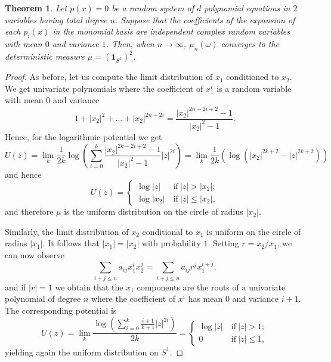 \documentclass[12pt]{article}
\def\bone{\boldsymbol{1}}
\newtheorem{theorem}{Theorem}[section]
\begin{document}
\begin{theorem}
     Let $p(x)=0$ be a random system of  $d$ polynomial equations in $2$ variables having total degree $n$. Suppose that the coefficients of the expansion of each $p_i(x)$ in the monomial basis are independent complex random variables with mean $0$ and variance $1$. Then, when $n \longrightarrow \infty$, $\mu_n(\omega)$ converges to the deterministic measure $\mu = (\bone_{S^1})^2$.
\end{theorem}
\begin{proof}
    As before, let us compute the limit distribution of $x_1$ conditioned to $x_2$. We get univariate polynomials where the coefficient of $x_1^i$ is a random variable with mean $0$ and variance $$1+|x_2|^2+\dots+|x_2|^{2n-2i}=\frac{|x_2|^{2n-2i+2}-1}{|x_2|^2-1}.$$
    Hence, for the logarithmic potential we get
    \[ U(z)=\lim_k \frac{1}{2k} \log \left( \sum_{i=0}^k \frac{|x_2|^{2k-2i+2}-1}{|x_2|^2-1} |z|^{2i} \right) =\lim_k \frac{1}{2k} \left(\log(|x_2|^{2k+2}-|z|^{2k+2}) \right)\] 
    and hence \[U(z)=\begin{cases}
        \log|z| \ &\mathrm{if} \ |z| > |x_2|;\\
        \log|x_2| \ &\mathrm{if} \ |z| \leq |x_2|,
    \end{cases}    \]   
    and therefore $\mu$ is the uniform distribution on the circle of radius $|x_2|$.

Similarly, the limit distribution of $x_2$ conditional to $x_1$ is uniform on the circle of radius $|x_1|$. It follows that $|x_1|=|x_2|$ with probability $1$. Setting $r=x_2/x_1$, we can now observe
\[  \sum_{i+j\leq n} a_{ij} x_1^i x_2^j = \sum_{i+j\leq n} a_{ij} r^j x_1^{i+j},\]
and if $|r|=1$ we obtain that the $x_1$ components are the roots of a univariate polynomial of degree $n$ where the coefficient of $x^i$ has mean $0$ and variance $i+1$. The corresponding potential is
\[ U(z) = \lim_{k} \frac{\log\left(\sum_{i=0}^{k} \frac{i+1}{k+1}|z|^{2i}\right)}{2k} =  \begin{cases}
        \log|z| \ &\mathrm{if} \ |z| > 1;\\
        0 \ &\mathrm{if} \ |z| \leq 1,
    \end{cases}   \]
    yielding again the uniform distribution on $S^1$.
\end{proof}
\end{document}
